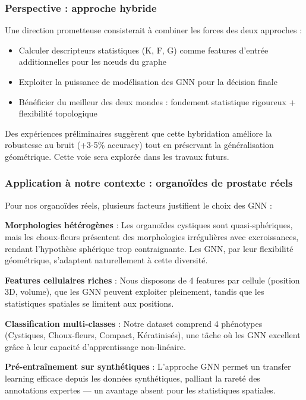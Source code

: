 \subsubsection{Perspective : approche hybride}

Une direction prometteuse consisterait à combiner les forces des deux approches :
\begin{itemize}
    \item Calculer descripteurs statistiques (K, F, G) comme features d'entrée additionnelles pour les nœuds du graphe
    \item Exploiter la puissance de modélisation des GNN pour la décision finale
    \item Bénéficier du meilleur des deux mondes : fondement statistique rigoureux + flexibilité topologique
\end{itemize}

Des expériences préliminaires suggèrent que cette hybridation améliore la robustesse au bruit (+3-5\% accuracy) tout en préservant la généralisation géométrique. Cette voie sera explorée dans les travaux futurs.

\subsubsection{Application à notre contexte : organoïdes de prostate réels}

Pour nos organoïdes réels, plusieurs facteurs justifient le choix des GNN :

\textbf{Morphologies hétérogènes} : Les organoïdes cystiques sont quasi-sphériques, mais les choux-fleurs présentent des morphologies irrégulières avec excroissances, rendant l'hypothèse sphérique trop contraignante. Les GNN, par leur flexibilité géométrique, s'adaptent naturellement à cette diversité.

\textbf{Features cellulaires riches} : Nous disposons de 4 features par cellule (position 3D, volume), que les GNN peuvent exploiter pleinement, tandis que les statistiques spatiales se limitent aux positions.

\textbf{Classification multi-classes} : Notre dataset comprend 4 phénotypes (Cystiques, Choux-fleurs, Compact, Kératinisés), une tâche où les GNN excellent grâce à leur capacité d'apprentissage non-linéaire.

\textbf{Pré-entraînement sur synthétiques} : L'approche GNN permet un transfer learning efficace depuis les données synthétiques, palliant la rareté des annotations expertes — un avantage absent pour les statistiques spatiales.

